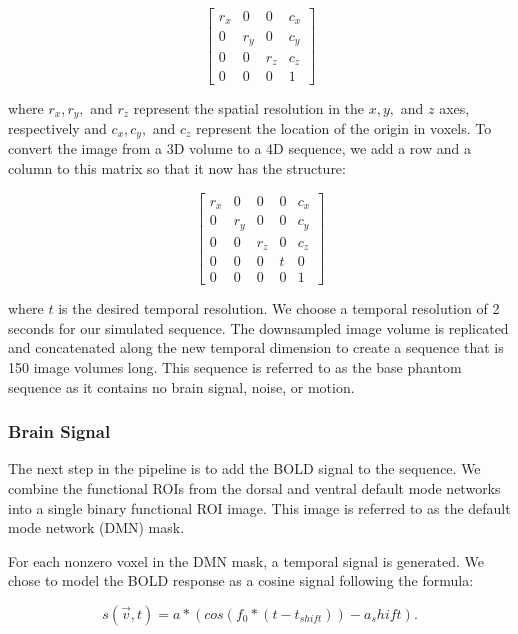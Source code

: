 \begin{equation}
\begin{bmatrix}
 r_x &  0   &  0   & c_x\\ 
 0   &  r_y &  0   & c_y \\ 
 0   &  0   &  r_z & c_z \\ 
 0   &  0   &  0   & 1 
\end{bmatrix}
\end{equation}

\noindent where $r_x, r_y,$ and $r_z$ represent the spatial resolution in the $x, y,$ and $z$ axes, respectively and $c_x, c_y,$ and $c_z$ represent the location of the origin in voxels. To convert the image from a 3D volume to a 4D sequence, we add a row and a column to this matrix so that it now has the structure:

\begin{equation}
\begin{bmatrix}
 r_x &  0   &  0   & 0 & c_x\\ 
 0   &  r_y &  0   & 0 & c_y \\ 
 0   &  0   &  r_z & 0 & c_z \\ 
 0   &  0   &  0   & t & 0 \\
 0   &  0   &  0   & 0 & 1 
\end{bmatrix}
\end{equation}

\noindent where $t$ is the desired temporal resolution. We choose a temporal resolution of 2 seconds for our simulated sequence. The downsampled image volume is replicated and concatenated along the new temporal dimension to create a sequence that is 150 image volumes long. This sequence is referred to as the base phantom sequence as it contains no brain signal, noise, or motion.

\subsubsection{Brain Signal}

The next step in the pipeline is to add the BOLD signal to the sequence. 
We combine the functional ROIs from the dorsal and ventral default mode networks into a single binary functional ROI image. This image is referred to as the default mode network (DMN) mask. 

For each nonzero voxel in the DMN mask, a temporal signal is generated. We chose to model the BOLD response as a cosine signal following the formula:

\begin{equation}
s(\vec{v}, t) = a*(cos(f_0 * (t-t_{shift})) - a_shift).
\label{ch5:bold_eq}
\end{equation}

